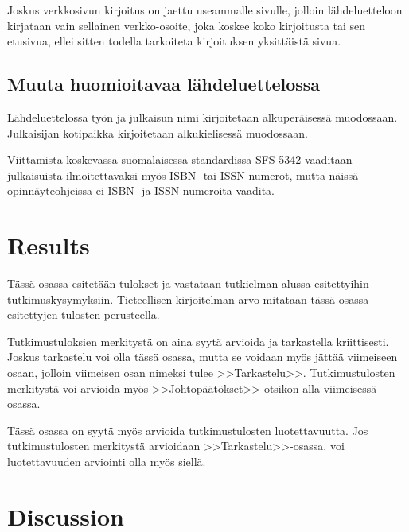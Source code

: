 \documentclass[english,12pt,a4paper,pdftex,elec,utf8]{aaltothesis}
\begin{document}
Joskus verkkosivun kirjoitus on jaettu useammalle sivulle, jolloin
l\"ahdeluetteloon kirjataan vain sellainen verkko-osoite, joka koskee
koko kirjoitusta tai sen etusivua, ellei sitten
todella tarkoiteta kirjoituksen yksitt\"aist\"a sivua.

\subsection*{Muuta huomioitavaa l\"ahdeluettelossa}

L\"ahdeluettelossa ty\"on ja julkaisun nimi kirjoitetaan alkuper\"aisess\"a
muodossaan. Julkaisijan kotipaikka kirjoitetaan alkukielisess\"a
muodossaan.

Viittamista koskevassa suomalaisessa standardissa
SFS 5342 \cite{sfs} vaaditaan julkaisuista ilmoitettavaksi my\"os ISBN- tai
ISSN-numerot, mutta n\"aiss\"a opinn\"ayteohjeissa ei ISBN- ja
ISSN-numeroita vaadita.

\clearpage

\section{Results}

T\"ass\"a osassa esitet\"a\"an tulokset ja vastataan tutkielman alussa
esitettyihin tutkimuskysymyksiin. Tieteellisen kirjoitelman
arvo mitataan t\"ass\"a osassa esitettyjen tulosten perusteella.

Tutkimustuloksien merkityst\"a on aina syyt\"a arvioida ja tarkastella
kriittisesti.  Joskus tarkastelu voi olla t\"ass\"a osassa, mutta se
voidaan my\"os j\"att\"a\"a viimeiseen osaan, jolloin viimeisen osan nimeksi
tulee >>Tarkastelu>>. Tutkimustulosten merkityst\"a voi arvioida my\"os
>>Johtop\"a\"at\"okset>>-otsikon alla viimeisess\"a osassa.

T\"ass\"a osassa on syyt\"a my\"os arvioida tutkimustulosten luotettavuutta.
Jos tutkimustulosten merkityst\"a arvioidaan >>Tarkastelu>>-osassa,
voi luotettavuuden arviointi olla my\"os siell\"a.

\clearpage

\section{Discussion}
\end{document}
